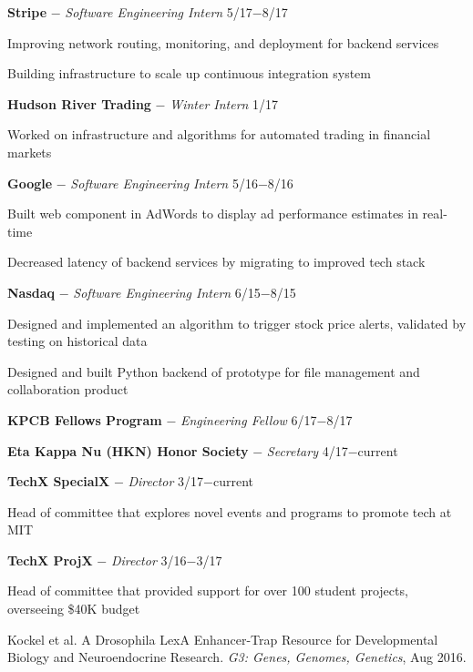 \documentclass[11pt]{article}
\newcommand{\msection}[1]{\vspace{1em}\marginnote{#1}} %
\newcommand{\bt}[1]{\textbf{#1}} %
\newcommand{\gap}[0]{\vspace{0.7em}} %
\newcommand{\dash}[0]{ $-$ } %
\begin{document}
\gap

\bt{Stripe}\dash \emph{Software Engineering Intern} \hfill 5/17$-$8/17

Improving network routing, monitoring, and deployment for backend services

Building infrastructure to scale up continuous integration system

\gap

\bt{Hudson River Trading}\dash \emph{Winter Intern} \hfill 1/17

Worked on infrastructure and algorithms for automated trading in financial markets

\gap

\bt{Google}\dash \emph{Software Engineering Intern} \hfill 5/16$-$8/16

Built web component in AdWords to display ad performance estimates in real-time

Decreased latency of backend services by migrating to improved tech stack

\gap

\bt{Nasdaq}\dash \emph{Software Engineering Intern} \hfill 6/15$-$8/15

Designed and implemented an algorithm to trigger stock price alerts, validated by testing on historical data

Designed and built Python backend of prototype for file management and collaboration product



\msection{Leadership}

\bt{KPCB Fellows Program}\dash \emph{Engineering Fellow} \hfill 6/17$-$8/17

\gap

\bt{Eta Kappa Nu (HKN) Honor Society}\dash \emph{Secretary} \hfill 4/17$-$current

\gap

\bt{TechX SpecialX}\dash \emph{Director} \hfill 3/17$-$current

Head of committee that explores novel events and programs to promote tech at MIT

\gap

\bt{TechX ProjX}\dash \emph{Director} \hfill 3/16$-$3/17

Head of committee that provided support for over 100 student projects, overseeing \$40K budget


\msection{Publications}
Kockel et al. A Drosophila LexA Enhancer-Trap Resource for Developmental Biology and Neuroendocrine Research. \emph{G3: Genes, Genomes, Genetics}, Aug 2016.
\end{document}
